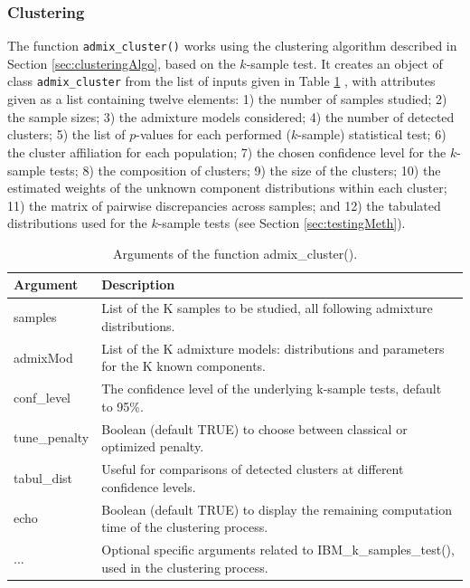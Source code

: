 \subsubsection{Clustering}\label{clustering}

The function \texttt{admix\_cluster()} works using the clustering algorithm described in Section \ref{sec:clusteringAlgo}, based on the \(k\)-sample test. It creates an object of class \texttt{admix\_cluster} from the list of inputs given in Table \ref{tab:admixClusterArgs-latex} , with attributes given as a list containing twelve elements: 1) the number of samples studied; 2) the sample sizes; 3) the admixture models considered; 4) the number of detected clusters; 5) the list of \(p\)-values for each performed (\(k\)-sample) statistical test; 6) the cluster affiliation for each population; 7) the chosen confidence level for the \(k\)-sample tests; 8) the composition of clusters; 9) the size of the clusters; 10) the estimated weights of the unknown component distributions within each cluster; 11) the matrix of pairwise discrepancies across samples; and 12) the tabulated distributions used for the \(k\)-sample tests (see Section \ref{sec:testingMeth}).

\begin{table}[!h]
\centering
\caption{\label{tab:admixClusterArgs-latex}Arguments of the function admix\_cluster().}
\centering
\fontsize{8}{10}\selectfont
\begin{tabular}[t]{ll}
\toprule
Argument & Description\\
\midrule
samples & List of the K samples to be studied, all following admixture distributions.\\
admixMod & List of the K admixture models: distributions and parameters for the K known components.\\
conf\_level & The confidence level of the underlying k-sample tests, default to 95\%.\\
tune\_penalty & Boolean (default TRUE) to choose between classical or optimized penalty.\\
tabul\_dist & Useful for comparisons of detected clusters at different confidence levels.\\
echo & Boolean (default TRUE) to display the remaining computation time of the clustering process.\\
... & Optional specific arguments related to IBM\_k\_samples\_test(), used in the clustering process.\\
\bottomrule
\end{tabular}
\end{table}

